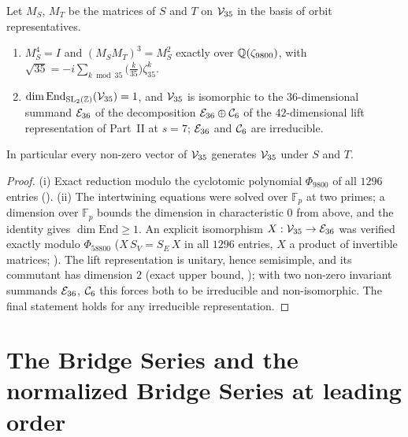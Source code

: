 \begin{proposition}\label{prop:sl2}
Let $M_S$, $M_T$ be the matrices of $S$ and $T$ on $\mathcal V_{35}$ in the basis of orbit representatives.
\begin{enumerate}[label=(\roman*)]
\item $M_S^4=I$ and $(M_SM_T)^3=M_S^2$ exactly over $\mathbb{Q}(\zeta_{9800})$, with $\sqrt{35}=-i\sum_{k\bmod35}\bigl(\tfrac k{35}\bigr)\zeta_{35}^k$.
\item $\dim\mathrm{End}_{\mathrm{SL}_2(\mathbb{Z})}(\mathcal V_{35})=1$, and $\mathcal V_{35}$ is isomorphic to the $36$-dimensional summand $\mathcal E_{36}$ of the decomposition
$\mathcal E_{36}\oplus\mathcal C_{6}$ of the $42$-dimensional lift representation of Part~II at $s=7$; $\mathcal E_{36}$ and $\mathcal C_{6}$ are irreducible.
\end{enumerate}
In particular every non-zero vector of $\mathcal V_{35}$ generates $\mathcal V_{35}$ under $S$ and $T$.
\end{proposition}
\begin{proof}
(i) Exact reduction modulo the cyclotomic polynomial $\Phi_{9800}$ of all $1296$ entries ().
(ii) The intertwining equations were solved over $\mathbb F_p$ at two primes; a dimension over $\mathbb F_p$ bounds the dimension in
characteristic $0$ from above, and the identity gives $\dim\mathrm{End}\ge1$. An explicit isomorphism $X:\mathcal V_{35}\to\mathcal E_{36}$ was verified exactly modulo
$\Phi_{58800}$ ($X\,S_V=S_E\,X$ in all $1296$ entries, $X$ a product of invertible matrices; ).
The lift representation is unitary, hence semisimple, and its commutant has dimension $2$ (exact upper bound, );
with two non-zero invariant summands $\mathcal E_{36}$, $\mathcal C_{6}$ this forces both to be irreducible and non-isomorphic. The final statement holds for any irreducible
representation.
\end{proof}

\section{The Bridge Series and the normalized Bridge Series at leading order}\label{sec:p3lead}
